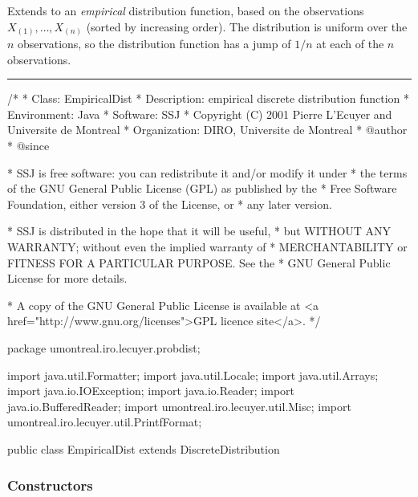 
Extends  to an \emph{empirical}
distribution function,
based on the observations $X_{(1)},\dots,X_{(n)}$ (sorted by increasing order).
The distribution is uniform over the $n$ observations, so the
distribution function has a jump of $1/n$ at each of the $n$ observations.


\bigskip\hrule

\begin{code}
\begin{hide}
/*
 * Class:        EmpiricalDist
 * Description:  empirical discrete distribution function
 * Environment:  Java
 * Software:     SSJ
 * Copyright (C) 2001  Pierre L'Ecuyer and Universite de Montreal
 * Organization: DIRO, Universite de Montreal
 * @author
 * @since

 * SSJ is free software: you can redistribute it and/or modify it under
 * the terms of the GNU General Public License (GPL) as published by the
 * Free Software Foundation, either version 3 of the License, or
 * any later version.

 * SSJ is distributed in the hope that it will be useful,
 * but WITHOUT ANY WARRANTY; without even the implied warranty of
 * MERCHANTABILITY or FITNESS FOR A PARTICULAR PURPOSE.  See the
 * GNU General Public License for more details.

 * A copy of the GNU General Public License is available at
   <a href="http://www.gnu.org/licenses">GPL licence site</a>.
 */
\end{hide}
package umontreal.iro.lecuyer.probdist;\begin{hide}

import java.util.Formatter;
import java.util.Locale;
import java.util.Arrays;
import java.io.IOException;
import java.io.Reader;
import java.io.BufferedReader;
import umontreal.iro.lecuyer.util.Misc;
import umontreal.iro.lecuyer.util.PrintfFormat;
\end{hide}

public class EmpiricalDist extends DiscreteDistribution\begin{hide} {
   private int n = 0;
   private double sampleMean;
   private double sampleVariance;
   private double sampleStandardDeviation;
\end{hide}
\end{code}
\subsubsection* {Constructors}

